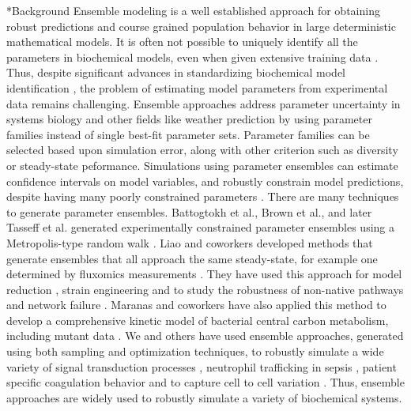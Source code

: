 \documentclass[12pt]{article}
\makeatletter
\renewcommand\section{\@startsection
	{subsection}{2}{0mm}
	{-0.2in}
	{0.05\baselineskip}
	{\normalfont\large\bfseries}}
\makeatother
\begin{document}
\section*{Background}
Ensemble modeling is a well established approach for obtaining robust predictions and course grained population behavior in large deterministic mathematical models.
It is often not possible to uniquely identify all the parameters in biochemical models, even when given extensive training data \cite{Gadkar:2005ad}.
Thus, despite significant advances in standardizing biochemical model identification \cite{Gennemark:2009on},
the problem of estimating model parameters from experimental data remains challenging.
Ensemble approaches address parameter uncertainty in systems biology and other fields like weather prediction \cite{Battogtokh:2002,Kuepfer:2007, Brown:2003,Palmer:2005}
by using parameter families instead of single best-fit parameter sets.
Parameter families can be selected based upon simulation error, along with other criterion such as diversity or steady-state peformance.
Simulations using parameter ensembles can estimate confidence intervals on model variables, and robustly constrain model predictions,
despite having many poorly constrained parameters \cite{Gutenkunst2007,Song:2009b}.
There are many techniques to generate parameter ensembles.
Battogtokh et al., Brown et al., and later Tasseff et al. generated experimentally constrained parameter ensembles using a
Metropolis-type random walk \cite{Battogtokh:2002,Brown:2003,Tasseff:2010aa,Tasseff:2011aa}.
Liao and coworkers developed methods that generate ensembles that all approach the same steady-state, for example one determined by fluxomics measurements \cite{Tran:2008aa}.
They have used this approach for model reduction \cite{Tan:2011aa}, strain engineering \cite{Contador2009221,Tan:2012aa} and to study the robustness of non-native pathways and network failure \cite{Lee:2014aa}. Maranas and coworkers have also applied this method to develop a comprehensive kinetic model of bacterial central carbon metabolism,
including mutant data \cite{Khodayari:2014aa}.
We and others have used ensemble approaches, generated using both sampling and optimization techniques, to robustly simulate a wide variety of signal transduction processes \citep{Luan:2007aa,Song:2009aa,Tasseff:2010aa,Tasseff:2011aa,Nayak:2011aa}, neutrophil trafficking in sepsis \cite{Song:2012aa},
patient specific coagulation behavior \cite{Luan:2010aa} and to capture cell to cell variation \cite{Lequieu:2011aa}.
Thus, ensemble approaches are widely used to robustly simulate a variety of biochemical systems.
\end{document}
